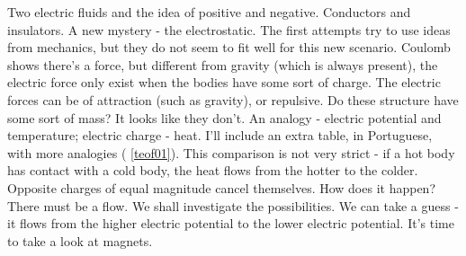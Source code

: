 \documentclass{cornell}
\begin{document}
\begin{tcolorbox}
\end{tcolorbox}


%
{Two electric fluids and the idea of positive and negative. Conductors and insulators. A  new mystery - the electrostatic. The first attempts try to use ideas from mechanics, but they do not seem to fit well for this new scenario. Coulomb shows there's a force, but different from gravity (which is always present), the electric force only exist when the bodies have some sort of charge. The electric forces can be of attraction (such as gravity),  or repulsive. Do these structure have some sort of mass? It looks like they don't. An analogy - electric potential and temperature; electric charge - heat. I'll include an extra table, in Portuguese, with more analogies ( \ref{teof01}). This comparison is not very strict - if a hot body has contact with a cold body, the heat flows from the hotter to the colder. Opposite charges of equal magnitude cancel themselves. How does it happen? There must be a flow. We shall investigate the possibilities. We can take a guess - it flows from the higher electric potential to the lower electric potential. It's time to take a look at magnets.}%
\end{document}
